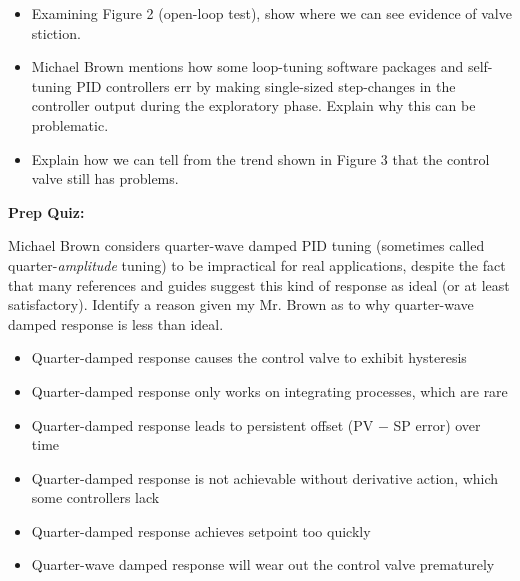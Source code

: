 \begin{itemize}
\item{} Examining Figure 2 (open-loop test), show where we can see evidence of valve stiction.
\item{} Michael Brown mentions how some loop-tuning software packages and self-tuning PID controllers err by making single-sized step-changes in the controller output during the exploratory phase.  Explain why this can be problematic.
\item{} Explain how we can tell from the trend shown in Figure 3 that the control valve still has problems.
\end{itemize}










\vfil \eject

\noindent
{\bf Prep Quiz:}

Michael Brown considers quarter-wave damped PID tuning (sometimes called quarter-{\it amplitude} tuning) to be impractical for real applications, despite the fact that many references and guides suggest this kind of response as ideal (or at least satisfactory).  Identify a reason given my Mr. Brown as to why quarter-wave damped response is less than ideal.

\begin{itemize}
\item{} Quarter-damped response causes the control valve to exhibit hysteresis
\vskip 5pt 
\item{} Quarter-damped response only works on integrating processes, which are rare
\vskip 5pt 
\item{} Quarter-damped response leads to persistent offset (PV $-$ SP error) over time
\vskip 5pt 
\item{} Quarter-damped response is not achievable without derivative action, which some controllers lack
\vskip 5pt 
\item{} Quarter-damped response achieves setpoint too quickly
\vskip 5pt 
\item{} Quarter-wave damped response will wear out the control valve prematurely
\end{itemize}




